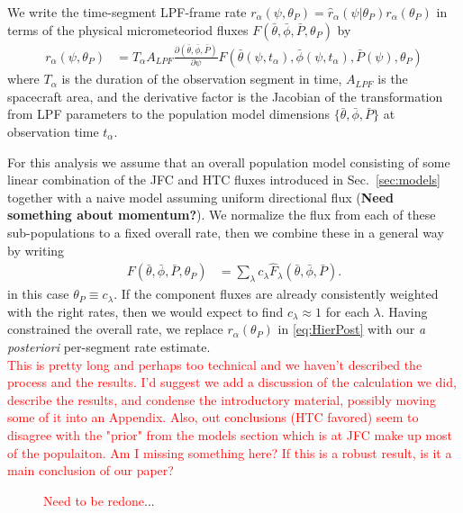 \documentclass[twocolumn, trackchanges]{aastex62}
\newcommand{\red}[1]{\textcolor{red}{#1}}
\begin{document}
 We write the time-segment LPF-frame rate $r_\alpha(\psi,\theta_P)=\hat r_\alpha(\psi|\theta_P)r_\alpha(\theta_P)$ in terms of the physical micrometeoriod fluxes $F(\bar\theta,\bar\phi,\bar P,\theta_P)$ by
\begin{align}
  r_\alpha(\psi,\theta_P)&=T_\alpha A_{LPF}\frac{\partial(\bar\theta,\bar\phi,\bar P)}{\partial\psi}F(\bar\theta(\psi,t_\alpha),\bar\phi(\psi,t_\alpha),\bar P(\psi),\theta_P)
\end{align}
where $T_\alpha$ is the duration of the observation segment in time, $A_{LPF}$ is the spacecraft area, and the derivative factor is the Jacobian of the transformation from LPF parameters to the population model dimensions $\{\bar\theta,\bar\phi,\bar P\}$ at observation time $t_\alpha$.

For this analysis we assume that an overall population model consisting of some linear combination of the JFC and HTC fluxes introduced in Sec.~\ref{sec:models} together with a naive model assuming uniform directional flux (\textbf{Need something about momentum?}). We normalize the flux from each of these sub-populations to a fixed overall rate, then we combine these in a general way by writing
\begin{align}
  F(\bar\theta,\bar\phi,\bar P,\theta_P)&=\sum_{\lambda} c_\lambda \hat F_\lambda(\bar\theta,\bar\phi,\bar P).\nonumber
\end{align}
in this case $\theta_P\equiv{c_\lambda}$.  If the component fluxes are already consistently weighted with the right rates, then we would expect to find $c_\lambda\approx1$ for each $\lambda$. Having constrained the overall rate, we replace $r_\alpha(\theta_P)$ in \eqref{eq:HierPost} with our \emph{a posteriori} per-segment rate estimate.
\\
\red{This is pretty long and perhaps too technical and we haven't described the process and the results. I'd suggest we add a discussion of the calculation we did, describe the results, and condense the introductory material, possibly moving some of it into an Appendix.  Also, out conclusions (HTC favored) seem to disagree with the "prior" from the models section which is at JFC make up most of the populaiton. Am I missing something here? If this is a robust result, is it a main conclusion of our paper?}

\begin{figure}
\caption{\red{Need to be redone}...\label{fig:bayes}}
\end{figure}
\end{document}

